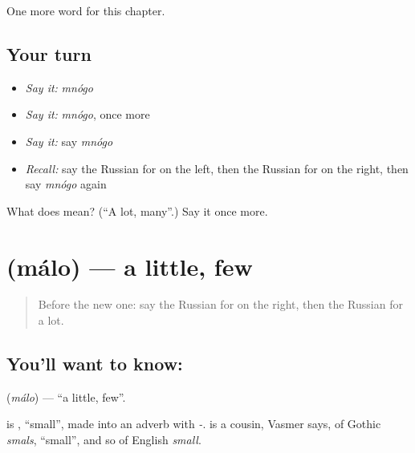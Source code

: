 \begin{grammarlens}[title={What you've built}]
One more word for this chapter.
\end{grammarlens}

\subsection*{Your turn}
\begin{itemize}
\raggedright
  \item \emph{Say it:} \emph{mnógo}
  \item \emph{Say it:} \emph{mnógo}, once more
  \item \emph{Say it:} say \emph{mnógo}
  \item \emph{Recall:} say the Russian for on the left, then the Russian for on the right, then say \emph{mnógo} again
\end{itemize}

\begin{tcolorbox}[breakable,colback=teal!4,colframe=teal!35!black,title={Before you move on}]
What does  mean? (\textquotedblleft{}A lot, many\textquotedblright{}.) Say it once more.
\end{tcolorbox}
\section[\texorpdfstring{\ru{мало} (málo)}{мало (málo)}]{ (málo) — a little, few}

\label{lesson:RU-C73-alittle}



\begin{quote}
Before the new one: say the Russian for on the right, then the Russian for a lot.
\end{quote}

\subsection*{You'll want to know: }
\textbf{} (\emph{málo}) — \textquotedblleft{}a little, few\textquotedblright{}.

\begin{cousinweb}
\textbf{} is \emph{}, \textquotedblleft{}small\textquotedblright{}, made into an adverb with \emph{-}. \emph{} is a cousin, Vasmer says, of Gothic \emph{smals}, \textquotedblleft{}small\textquotedblright{}, and so of English \emph{small}.
\end{cousinweb}


